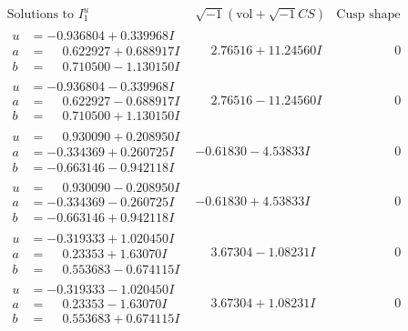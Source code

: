 \documentclass[1p]{elsarticle_modified}
\theoremstyle{definition}
\newcommand{\I}{\sqrt{-1}}
\begin{document}
$$\begin{array}{c|c|c}  
\text{Solutions to }I^u_{1}& \I (\text{vol} + \sqrt{-1}CS) & \text{Cusp shape}\\
 \hline 
\begin{aligned}
u &= -0.936804 + 0.339968 I \\
a &= \phantom{-}0.622927 + 0.688917 I \\
b &= \phantom{-}0.710500 - 1.130150 I\end{aligned}
 & \phantom{-}2.76516 + 11.24560 I & \phantom{-0.000000 } 0 \\ \hline\begin{aligned}
u &= -0.936804 - 0.339968 I \\
a &= \phantom{-}0.622927 - 0.688917 I \\
b &= \phantom{-}0.710500 + 1.130150 I\end{aligned}
 & \phantom{-}2.76516 - 11.24560 I & \phantom{-0.000000 } 0 \\ \hline\begin{aligned}
u &= \phantom{-}0.930090 + 0.208950 I \\
a &= -0.334369 + 0.260725 I \\
b &= -0.663146 - 0.942118 I\end{aligned}
 & -0.61830 - 4.53833 I & \phantom{-0.000000 } 0 \\ \hline\begin{aligned}
u &= \phantom{-}0.930090 - 0.208950 I \\
a &= -0.334369 - 0.260725 I \\
b &= -0.663146 + 0.942118 I\end{aligned}
 & -0.61830 + 4.53833 I & \phantom{-0.000000 } 0 \\ \hline\begin{aligned}
u &= -0.319333 + 1.020450 I \\
a &= \phantom{-}0.23353 + 1.63070 I \\
b &= \phantom{-}0.553683 - 0.674115 I\end{aligned}
 & \phantom{-}3.67304 - 1.08231 I & \phantom{-0.000000 } 0 \\ \hline\begin{aligned}
u &= -0.319333 - 1.020450 I \\
a &= \phantom{-}0.23353 - 1.63070 I \\
b &= \phantom{-}0.553683 + 0.674115 I\end{aligned}
 & \phantom{-}3.67304 + 1.08231 I & \phantom{-0.000000 } 0 \\ \hline\begin{aligned}

\end{aligned}
\end{array}$$
\end{document}
